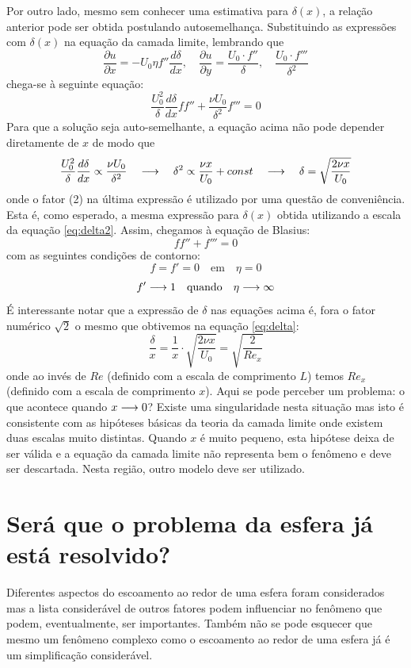 Por outro lado, mesmo sem conhecer uma estimativa para $\delta(x)$, a relação anterior pode ser obtida postulando autosemelhança. Substituindo as expressões com $\delta(x)$ na equação da camada limite, lembrando que 
\[
\frac{\partial u}{\partial x} = -U_0\eta f'' \frac{d\delta}{dx}, 
\quad \frac{\partial u}{\partial y} = \frac{U_0 \cdot f''}{\delta}, \quad \frac{U_0 \cdot f'''}{\delta^2}
\]
chega-se à seguinte equação:
\[
\frac{U_0^2}{\delta}\frac{d\delta}{dx} ff'' + \frac{\nu U_0}{\delta^2}f''' = 0
\]
Para que a solução seja auto-semelhante, a equação acima não pode depender diretamente de $x$ de modo que
\[
\frac{U_0^2}{\delta}\frac{d\delta}{dx} \propto \frac{\nu U_0}{\delta^2} \quad\longrightarrow\quad \delta^2 \propto \frac{\nu x}{U_0} + const \quad\longrightarrow\quad \delta = \sqrt{\frac{2 \nu x}{U_0}}
\]
onde o fator (2) na última expressão é utilizado por uma questão de conveniência. Esta é, como esperado, a mesma expressão para $\delta(x)$ obtida utilizando a escala da equação \ref{eq:delta2}. Assim, chegamos à equação de Blasius:
\[
ff'' + f''' = 0
\]
com as seguintes condições de contorno:
\[
f = f' = 0 \quad\text{em}\quad \eta = 0
\]
\[
f' \longrightarrow 1 \quad\text{quando}\quad \eta\longrightarrow\infty
\]
É interessante notar que a expressão de $\delta$ nas equações acima é, fora o fator numérico $\sqrt{2}$ o mesmo que obtivemos na equação \ref{eq:delta}:
\[
\frac{\delta}{x} = \frac{1}{x}\cdot \sqrt{\frac{2 \nu x}{U_0}} = \sqrt{\frac{2}{Re_x}}
\]
onde ao invés de $Re$ (definido com a escala de comprimento $L$) temos $Re_x$ (definido com a escala de comprimento $x$). Aqui se pode perceber um problema: o que acontece quando $x\longrightarrow 0$? Existe uma singularidade nesta situação  mas isto é consistente com as hipóteses básicas da teoria da camada limite onde existem duas escalas muito distintas. Quando $x$ é muito pequeno, esta hipótese deixa de ser válida e a equação da camada limite não representa bem o fenômeno e deve ser descartada. Nesta região, outro modelo deve ser utilizado.



\section{Será que o problema da esfera já está resolvido?}

Diferentes aspectos do escoamento ao redor de uma esfera foram considerados mas a lista considerável de outros fatores podem influenciar no fenômeno que podem, eventualmente, ser importantes. Também não se pode esquecer que mesmo um fenômeno complexo como o escoamento ao redor de uma esfera já é um simplificação considerável. 


